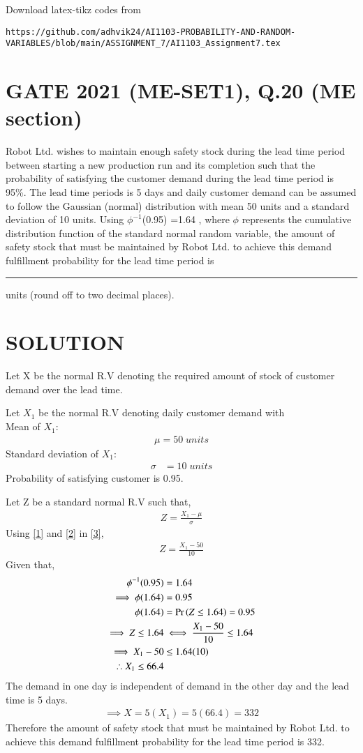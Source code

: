 \documentclass[journal,12pt,twocolumn]{IEEEtran}
\begin{document}
%
Download latex-tikz codes from 
%
\begin{lstlisting}
https://github.com/adhvik24/AI1103-PROBABILITY-AND-RANDOM-VARIABLES/blob/main/ASSIGNMENT_7/AI1103_Assignment7.tex
\end{lstlisting}
\section{GATE 2021 (ME-SET1), Q.20 (ME section)}
Robot Ltd. wishes to maintain enough safety
stock during the lead time period between
starting a new production run and its completion
such that the probability of satisfying the
customer demand during the lead time period
is 95\%. The lead time periods is 5 days and
daily customer demand can be assumed to follow
the Gaussian (normal) distribution with mean
50 units and a standard deviation of 10 units.
Using $\phi^{-1}$(0.95) =1.64 , where $\phi$ represents the
cumulative distribution function of the standard
normal random variable, the amount of safety
stock that must be maintained by Robot Ltd. to
achieve this demand fulfillment probability for
the lead time period is \rule{1cm}{0.15mm}  units (round off to
two decimal places).
\section{SOLUTION}
Let X be the normal R.V denoting the required amount of stock of customer demand over the lead time. 

Let $X_1$ be the normal R.V denoting daily customer demand with 
\\Mean of $X_1$:
\begin{align}
  \mu=50\;units\label{1}
\end{align}
Standard deviation of $X_1$:
\begin{align}
   \sigma &= 10\;units\label{2}
\end{align}
Probability of satisfying customer is 0.95.

Let Z be a standard normal R.V such that,
\begin{align}
    Z=\frac{X_1-\mu}{\sigma} \label{3}
\end{align}
Using \eqref{1} and \eqref{2} in \eqref{3},
\begin{align}
    Z=\frac{X_1-50}{10}\label{4}
\end{align}
Given that,
\begin{align}
    \phi^{-1}(0.95)&=1.64\\
    \implies \phi(1.64)&=0.95\\
    \phi(1.64)&=\Pr\left(Z\le1.64\right)=0.95\\
    \implies Z\le1.64&\iff\frac{X_1-50}{10}\le1.64\\
    \implies X_1-50 &\le 1.64(10)\\
    \therefore X_1\le66.4
\end{align}
The demand in one day is independent of demand in the other day and the lead time is 5 days.
\begin{align}
    \implies X=5(X_1)=5(66.4)=332
\end{align}
Therefore the amount of safety
stock that must be maintained by Robot Ltd. to
achieve this demand fulfillment probability for
the lead time period is 332.
\end{document}
